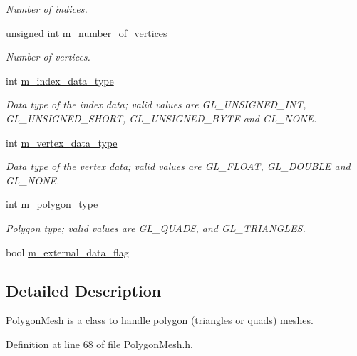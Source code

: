 \begin{DoxyCompactItemize}
\begin{DoxyCompactList}\small\item\em Number of indices. \end{DoxyCompactList}\item 
unsigned int \hyperlink{class_graphics_1_1_polygon_mesh_a18eea30ed69a85cea0702e365d586176}{m\_\-number\_\-of\_\-vertices}
\begin{DoxyCompactList}\small\item\em Number of vertices. \end{DoxyCompactList}\item 
int \hyperlink{class_graphics_1_1_polygon_mesh_acf9a781bb8d8b4a3905f41bea954e83d}{m\_\-index\_\-data\_\-type}
\begin{DoxyCompactList}\small\item\em Data type of the index data; valid values are GL\_\-UNSIGNED\_\-INT, GL\_\-UNSIGNED\_\-SHORT, GL\_\-UNSIGNED\_\-BYTE and GL\_\-NONE. \end{DoxyCompactList}\item 
int \hyperlink{class_graphics_1_1_polygon_mesh_aada40563d8efefb4cddec11ee124fdb7}{m\_\-vertex\_\-data\_\-type}
\begin{DoxyCompactList}\small\item\em Data type of the vertex data; valid values are GL\_\-FLOAT, GL\_\-DOUBLE and GL\_\-NONE. \end{DoxyCompactList}\item 
int \hyperlink{class_graphics_1_1_polygon_mesh_ac435c5305cb26572409a98779e66b0f2}{m\_\-polygon\_\-type}
\begin{DoxyCompactList}\small\item\em Polygon type; valid values are GL\_\-QUADS, and GL\_\-TRIANGLES. \end{DoxyCompactList}\item 
bool \hyperlink{class_graphics_1_1_polygon_mesh_a62bdefdd8c44bcc211f4472a756e835f}{m\_\-external\_\-data\_\-flag}
\end{DoxyCompactItemize}


\subsection{Detailed Description}
\hyperlink{class_graphics_1_1_polygon_mesh}{PolygonMesh} is a class to handle polygon (triangles or quads) meshes. 

Definition at line 68 of file PolygonMesh.h.



